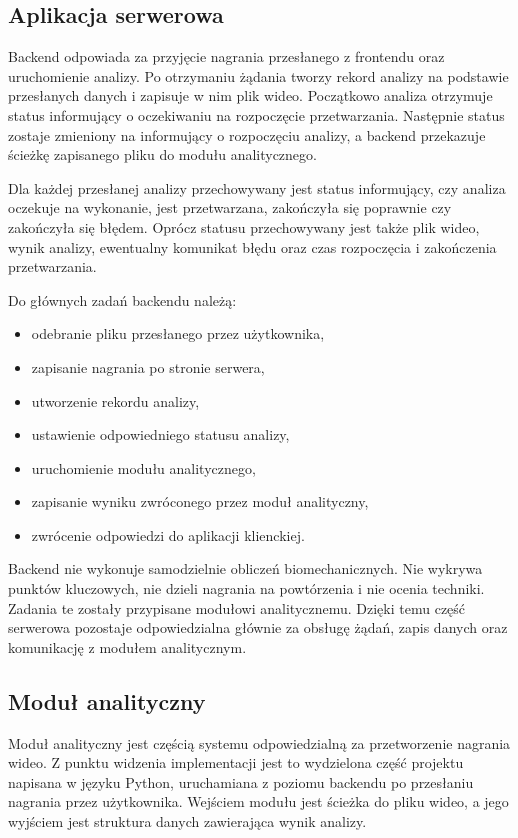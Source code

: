 \subsection{Aplikacja serwerowa}

Backend odpowiada za przyjęcie nagrania przesłanego z frontendu oraz uruchomienie analizy. Po otrzymaniu żądania tworzy rekord analizy na podstawie przesłanych danych i zapisuje w nim plik wideo. Początkowo analiza otrzymuje status informujący o oczekiwaniu na rozpoczęcie przetwarzania. Następnie status zostaje zmieniony na informujący o rozpoczęciu analizy, a backend przekazuje ścieżkę zapisanego pliku do modułu analitycznego.

Dla każdej przesłanej analizy przechowywany jest status informujący, czy analiza oczekuje na wykonanie, jest przetwarzana, zakończyła się poprawnie czy zakończyła się błędem. Oprócz statusu przechowywany jest także plik wideo, wynik analizy, ewentualny komunikat błędu oraz czas rozpoczęcia i zakończenia przetwarzania.

Do głównych zadań backendu należą:

\begin{itemize}
\item odebranie pliku przesłanego przez użytkownika,
\item zapisanie nagrania po stronie serwera,
\item utworzenie rekordu analizy,
\item ustawienie odpowiedniego statusu analizy,
\item uruchomienie modułu analitycznego,
\item zapisanie wyniku zwróconego przez moduł analityczny,
\item zwrócenie odpowiedzi do aplikacji klienckiej.
\end{itemize}

Backend nie wykonuje samodzielnie obliczeń biomechanicznych. Nie wykrywa punktów kluczowych, nie dzieli nagrania na powtórzenia i nie ocenia techniki. Zadania te zostały przypisane modułowi analitycznemu. Dzięki temu część serwerowa pozostaje odpowiedzialna głównie za obsługę żądań, zapis danych oraz komunikację z modułem analitycznym.

\subsection{Moduł analityczny}

Moduł analityczny jest częścią systemu odpowiedzialną za przetworzenie nagrania wideo. Z punktu widzenia implementacji jest to wydzielona część projektu napisana w języku Python, uruchamiana z poziomu backendu po przesłaniu nagrania przez użytkownika. Wejściem modułu jest ścieżka do pliku wideo, a jego wyjściem jest struktura danych zawierająca wynik analizy.

